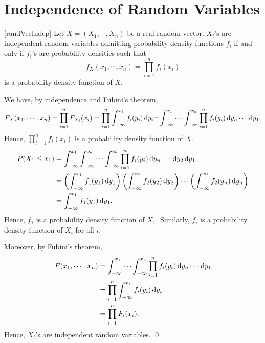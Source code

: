 \documentclass[../probability.tex]{subfiles}
\begin{document}
\section{Independence of Random Variables}

\begin{Theorem}{}[randVecIndep]
    Let \(X = (X_1, \cdots, X_n)\) be a real random vector.
    \(X_i\)'s are independent random variables admitting probability density
    functions \(f_i\) if and only if \(f_i\)'s are probability densities such that
    \begin{equation*}
        f_X(x_1, \cdots, x_n) = \prod_{i=1}^n f_i(x_i)
    \end{equation*}
    is a probability density function of \(X\).
\end{Theorem}
\begin{myclaim}[Proof]\hfill
\begin{pftfae}[labelwidth=\widthof{(\(\Rightarrow\))}]
    \ii[(\(\Rightarrow\))]
    We have, by independence and Fubini's theorem,
    \[
        F_X(x_1, \cdots, x_n) =
        \prod_{i=1}^n F_{X_i}(x_i)
        = \prod_{i=1}^n \int_{-\infty}^{x_i} f_i(y_i) \,\mathrm{d} y_i\text
        = \int_{-\infty}^{x_1} \cdots \int_{-\infty}^{x_n} \prod_{i=1}^n f_i(y_i) \,\mathrm{d} y_n \cdots \,\mathrm{d}
        y_1\text.
    \]
    Hence, \(\prod_{i=1}^n f_i(x_i)\) is a probability density function of \(X\).
    \ii[(\(\Leftarrow\))]
    \begin{align*}
        P(X_1 \le x_1)
        &= \int_{-\infty}^{x_1} \int_{-\infty}^\infty \cdots \int_{-\infty}^\infty
        \prod_{i=1}^n f_i(y_i) \,\mathrm{d} y_n \cdots \,\mathrm{d} y_2 \,\mathrm{d} y_1 \\
        &= \left(\int_{-\infty}^{x_1} f_1(y_1) \,\mathrm{d} y_1\right) \left(\int_{-\infty}^\infty f_2(y_2) \,\mathrm{d} y_2 \right)\cdots
        \left(\int_{-\infty}^\infty f_2(y_n) \,\mathrm{d} y_n \right) \\
        &= \int_{-\infty}^{x_1} f_1(y_1) \,\mathrm{d} y_1\text.
    \end{align*}
    Hence, \(f_1\) is a probability density function of \(X_1\).
    Similarly, \(f_i\) is a probability density function of \(X_i\) for all \(i\).

    Moreover, by Fubini's theorem,
    \begin{align*}
        F(x_1, \cdots, x_n)
        &= \int_{-\infty}^{x_1} \cdots \int_{-\infty}^{x_n} \prod_{i=1}^n f_i(y_i) \,\mathrm{d} y_n \cdots \,\mathrm{d} y_1 \\
        &= \prod_{i=1}^n \int_{-\infty}^{x_i} f_i(y_i) \,\mathrm{d} y_i \\
        &= \prod_{i=1}^n F_i(x_i)\text.
    \end{align*}
    Hence, \(X_i\)'s are independent random variables. \qed
\end{pftfae}
\end{myclaim}
\end{document}
